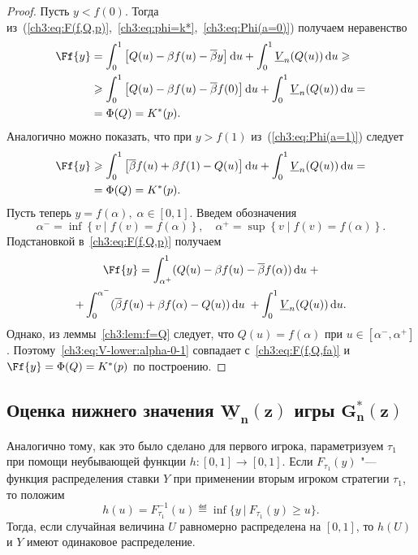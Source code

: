 {\begin{proof}
  Пусть $y < f(0)$.
  Тогда из~(\ref{ch3:eq:F(f,Q,p)},~\ref{ch3:eq:phi=k*},~\ref{ch3:eq:Phi(a=0)}) получаем неравенство
  \begin{align*}
    \Ff{y} 
    &= \int_0^1 \left[ 
      Q(u) - \Co f(u) - \DCo y 
    \right] \di u +
    \int_0^1 \LV{n}(Q(u)) \di u \geq \\
    &\geq \int_0^1 \left[ 
      Q(u) - \Co f(u) - \DCo f(0) 
    \right] \di u + \int_0^1 \LV{n}(Q(u)) \di u = \\
    &= \Phi(Q) = K^*(p).
  \end{align*}
  Аналогично можно показать, что при $y > f(1)$ из~(\ref{ch3:eq:Phi(a=1)}) следует
  \begin{align*}
    \Ff{y} 
    &\geq \int_0^1 \left[ 
      \DCo f(u) + \Co f(1) - Q(u) 
    \right] \di u + \int_0^1 \LV{n}(Q(u)) \di u = \\
    &= \Phi(Q) = K^*(p).
  \end{align*}
  Пусть теперь $y = f(\alpha), \; \alpha \in [0, 1]$. Введем обозначения
  \[
    \alpha^- = \inf \left\{ v \;|\; f(v) = f(\alpha) \right\}, \quad \alpha^+ =
    \sup \left\{ v \;|\; f(v) = f(\alpha) \right\}.
  \]
  Подстановкой в~\eqref{ch3:eq:F(f,Q,p)} получаем
  \begin{multline}\label{ch3:eq:V-lower:alpha-0-1}
    \Ff{y} =
    \int_{\alpha^+}^1  (Q(u) - \Co f(u) - \DCo f(\alpha)) \di u \; + \\
    + \int_0^{\alpha^-} (\DCo f(u) + \Co f(\alpha) - Q(u)) \di u \; + \int_0^1
    \LV{n}(Q(u)) \di u.
  \end{multline}
  Однако, из леммы~\ref{ch3:lem:f=Q} следует, что $Q(u) = f(\alpha)$ при $u \in [\alpha^-, \alpha^+]$.
  Поэтому~\eqref{ch3:eq:V-lower:alpha-0-1} совпадает с~\eqref{ch3:eq:F(f,Q,fa)} и $\Ff{y} = \Phi(Q) = K^*(p)$ по построению.
\end{proof}

\subsection{Оценка нижнего значения $\mathbf{\underline{W}_{n}(z)}$ игры $\mathbf{G^*_n(z)}$}
\label{ch3:sec:-dual-game}

Аналогично тому, как это было сделано для первого игрока, параметризуем $\tau_1$ при помощи неубывающей функции $h: [0, 1] \rightarrow [0, 1]$.
Если $F_{\tau_1}(y)$ "--- функция распределения ставки $Y$ при применении вторым игроком стратегии $\tau_1$, то положим
\begin{equation*}
  h(u) = F^{-1}_{\tau_1}(u) \eqdef \inf \{ y\ |\ F_{\tau_1}(y) \geq u \}.
\end{equation*}
Тогда, если случайная величина $U$ равномерно распределена на $[0, 1]$, то $h(U)$ и $Y$ имеют одинаковое распределение.

}
